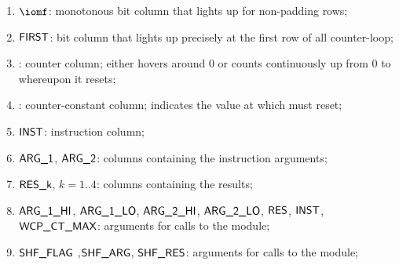 \begin{enumerate}
    \item $\iomf$:
	monotonous bit column that lights up for non-padding rows;
    \item $\textsf{FIRST}$:
	bit column that lights up precisely at the first row of all counter-loop;
    \item \ct{}:
	counter column; 
	either hovers around $0$ or counts continuously up from $0$ to \maxCt{} whereupon it resets;
    \item \maxCt:
	counter-constant column;
	indicates the value at which \ct{} must reset;
    \item
	\godGiven{}
	$\textsf{INST}{}$:
	instruction column;
    \item
	\godGiven{}
	$\textsf{ARG}\textsf{\_1}$, $\textsf{ARG}\textsf{\_2}$:
	columns containing the instruction arguments;
    \item
	\markAsJustifiedHere{}
	$\textsf{RES\_k}$, $k=1..4$:
	columns containing the results;
    \item $\textsf{ARG}\textsf{\_1}\textsf{\_HI}$, $\textsf{ARG}\textsf{\_1}\textsf{\_LO}$, $\textsf{ARG}\textsf{\_2}\textsf{\_HI}$, $\textsf{ARG}\textsf{\_2}\textsf{\_LO}$, $\textsf{RES}$, $\textsf{INST}$, $\textsf{WCP\_CT\_MAX}$:
	arguments for calls to the \wcpMod{} module;
    \item $\textsf{SHF\_FLAG}$ ,$\textsf{SHF\_ARG}$, $\textsf{SHF\_RES}$:
	arguments for calls to the \shfMod{} module;
\end{enumerate}
